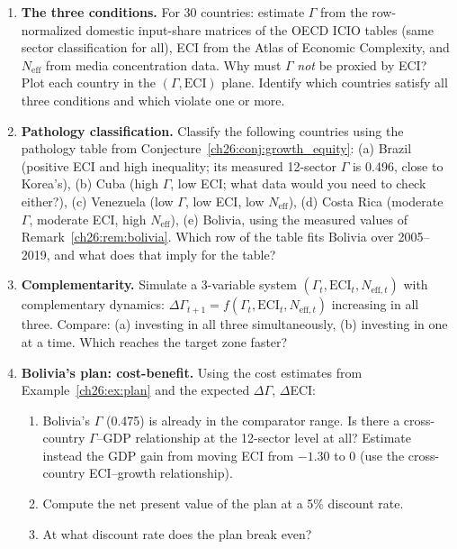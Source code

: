 \documentclass[../structural_economics_book.tex]{subfiles}
\begin{document}
\begin{enumerate}[label=\textbf{26.\arabic*}, leftmargin=3em]

\item \textbf{The three conditions.} For 30 countries: estimate $\Gamma$ from the row-normalized domestic input-share matrices of the OECD ICIO tables (same sector classification for all), ECI from the Atlas of Economic Complexity, and $N_{\text{eff}}$ from media concentration data. Why must $\Gamma$ \emph{not} be proxied by ECI? Plot each country in the $(\Gamma, \text{ECI})$ plane. Identify which countries satisfy all three conditions and which violate one or more.

\item \textbf{Pathology classification.} Classify the following countries using the pathology table from Conjecture~\ref{ch26:conj:growth_equity}: (a) Brazil (positive ECI and high inequality; its measured 12-sector $\Gamma$ is 0.496, close to Korea's), (b) Cuba (high $\Gamma$, low ECI; what data would you need to check either?), (c) Venezuela (low $\Gamma$, low ECI, low $N_{\text{eff}}$), (d) Costa Rica (moderate $\Gamma$, moderate ECI, high $N_{\text{eff}}$), (e) Bolivia, using the measured values of Remark~\ref{ch26:rem:bolivia}. Which row of the table fits Bolivia over 2005--2019, and what does that imply for the table?

\item \textbf{Complementarity.} Simulate a 3-variable system $(\Gamma_t, \text{ECI}_t, N_{\text{eff},t})$ with complementary dynamics: $\Delta\Gamma_{t+1} = f(\Gamma_t, \text{ECI}_t, N_{\text{eff},t})$ increasing in all three. Compare: (a) investing in all three simultaneously, (b) investing in one at a time. Which reaches the target zone faster?

\item \textbf{Bolivia's plan: cost-benefit.} Using the cost estimates from Example~\ref{ch26:ex:plan} and the expected $\Delta\Gamma$, $\Delta$ECI:
\begin{enumerate}
\item Bolivia's $\Gamma$ (0.475) is already in the comparator range. Is there a cross-country $\Gamma$--GDP relationship at the 12-sector level at all? Estimate instead the GDP gain from moving ECI from $-1.30$ to 0 (use the cross-country ECI--growth relationship).
\item Compute the net present value of the plan at a 5\% discount rate.
\item At what discount rate does the plan break even?
\end{enumerate}


\end{enumerate}
\end{document}
